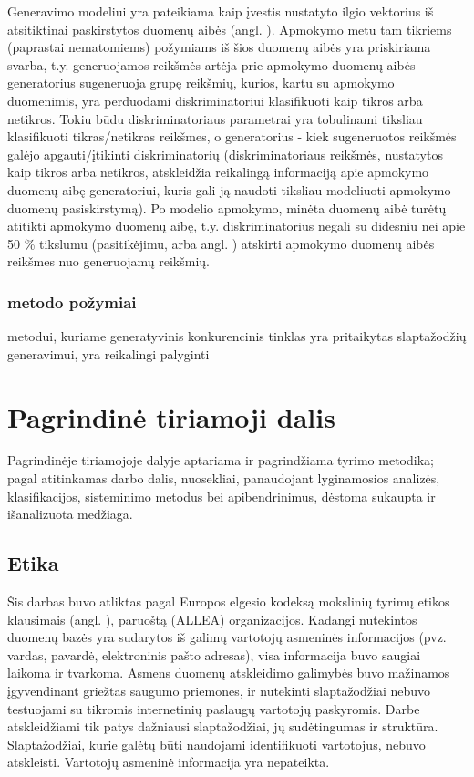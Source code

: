 \documentclass{VUMIFInfBakalaurinis}
\begin{document}
Generavimo modeliui yra pateikiama kaip įvestis nustatyto ilgio vektorius iš 
atsitiktinai paskirstytos duomenų aibės (angl. ). Apmokymo metu tam tikriems (paprastai nematomiems) požymiams iš 
šios duomenų aibės yra priskiriama svarba, t.y. generuojamos reikšmės artėja 
prie apmokymo duomenų aibės - generatorius sugeneruoja grupę reikšmių, kurios, 
kartu su apmokymo duomenimis, yra perduodami diskriminatoriui klasifikuoti kaip 
tikros arba netikros. Tokiu būdu diskriminatoriaus parametrai yra tobulinami 
tiksliau klasifikuoti tikras/netikras reikšmes, o generatorius - kiek 
sugeneruotos reikšmės galėjo apgauti/įtikinti diskriminatorių (diskriminatoriaus 
reikšmės, nustatytos kaip tikros arba netikros, atskleidžia reikalingą 
informaciją apie apmokymo duomenų aibę generatoriui, kuris gali ją naudoti 
tiksliau modeliuoti apmokymo duomenų pasiskirstymą). Po modelio apmokymo, minėta 
duomenų aibė turėtų atitikti apmokymo duomenų aibę, t.y. diskriminatorius negali 
su didesniu nei apie 50 \% tikslumu (pasitikėjimu, arba angl. 
) atskirti apmokymo duomenų aibės reikšmes nuo generuojamų 
reikšmių.
\subsubsection{ metodo požymiai}
 metodui, kuriame generatyvinis konkurencinis tinklas yra 
pritaikytas slaptažodžių generavimui, yra reikalingi palyginti 


\cite{DBLP:journals/corr/abs-1709-00440}

\section{Pagrindinė tiriamoji dalis}
Pagrindinėje tiriamojoje dalyje aptariama ir pagrindžiama tyrimo metodika;
pagal atitinkamas darbo dalis, nuosekliai, panaudojant lyginamosios analizės,
klasifikacijos, sisteminimo metodus bei apibendrinimus, dėstoma sukaupta ir
išanalizuota medžiaga. 

\subsection{Etika}
Šis darbas buvo atliktas pagal Europos elgesio kodeksą mokslinių tyrimų etikos 
klausimais
(angl. ), paruoštą 
 (ALLEA) 
organizacijos. Kadangi nutekintos duomenų bazės yra sudarytos iš galimų 
vartotojų asmeninės informacijos (pvz. vardas, pavardė, elektroninis pašto 
adresas), visa informacija buvo saugiai laikoma ir tvarkoma. Asmens duomenų 
atskleidimo galimybės buvo mažinamos įgyvendinant griežtas saugumo priemones, ir 
nutekinti slaptažodžiai nebuvo testuojami su tikromis internetinių paslaugų 
vartotojų paskyromis. Darbe atskleidžiami tik patys dažniausi slaptažodžiai, jų 
sudėtingumas ir struktūra. Slaptažodžiai, kurie galėtų būti naudojami 
identifikuoti vartotojus, nebuvo atskleisti. Vartotojų asmeninė informacija yra 
nepateikta.
\end{document}

